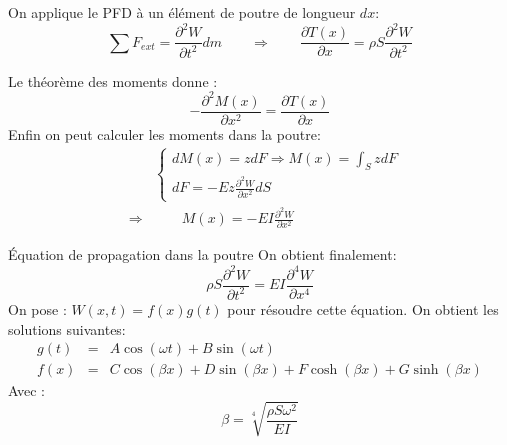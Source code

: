 \documentclass[xcolor=x11names,compress]{beamer}
\renewcommand{\(}{\begin{columns}}
\renewcommand{\)}{\end{columns}}
\newcommand{\<}[1]{\begin{column}{#1}}
\renewcommand{\>}{\end{column}}
\begin{document}
\begin{frame}{}

On applique le PFD à un élément de poutre de longueur $dx$:
\begin{equation}
\sum F_{ext} = \frac{\partial ^2 W}{\partial t^2} dm \qquad \Rightarrow \qquad \boxed{\frac{\partial T(x)}{\partial x} = \rho S \frac{\partial ^2 W}{\partial t^2}}
\end{equation}

Le théorème des moments donne : 
\begin{equation}
\boxed{-\frac{\partial ^2 M(x)}{\partial x^2} = \frac{\partial T(x)}{\partial x}}
\end{equation}
Enfin on peut calculer les moments dans la poutre:
\begin{eqnarray}
&&
\begin{cases}
dM(x) = z dF \Rightarrow M(x) = \int_S z dF \\
dF = -E z \frac{\partial ^2 W}{\partial x^2} dS
\end{cases} \\
 &\Rightarrow & \qquad \boxed{M(x) = -E I \frac{\partial ^2 W}{\partial x^2}}
\end{eqnarray}
\end{frame}

\begin{frame}{Équation de propagation dans la poutre}
On obtient finalement:
\begin{equation}
\rho S \frac{\partial ^2 W}{\partial t^2} = E I \frac{\partial ^4 W}{\partial x^4}
\end{equation}
On pose : $W(x,t) = f(x) g(t)$ pour résoudre cette équation. On obtient les solutions suivantes:
\begin{eqnarray*}
g(t) & = & A \cos(\omega t) + B \sin(\omega t) \\
f(x) & = & C \cos(\beta x) + D \sin(\beta x) + F \cosh(\beta x) + G \sinh(\beta x)
\end{eqnarray*}
Avec :
\begin{equation}
\beta = \sqrt[4]{\frac{\rho S \omega^2}{EI}}
\label{eq1}
\end{equation}
\end{frame}
\end{document}
